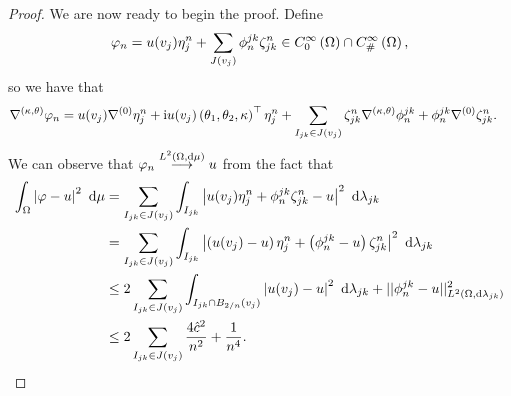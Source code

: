 \begin{proof}
	We are now ready to begin the proof.
	Define 
	\begin{align*}	
		\varphi_n = u(v_j)\eta_j^n + \sum_{J(v_j)}\phi^{jk}_n\zeta_{jk}^n\in C^{\infty}_{0}\left( \Omega \right)\cap C^{\infty}_{\#}\left( \Omega \right),
	\end{align*}
	so we have that
	\begin{align*}
		\nabla^{\left( \kappa, \theta \right)}\varphi_n 
		&= u(v_j)\nabla^{(0)}\eta_j^n + \mathrm{i} u(v_j)\left( \theta_1,\theta_2,\kappa \right)^\top\eta_j^n + \sum_{I_{jk}\in J(v_j)}\zeta_{jk}^n\nabla^{\left( \kappa, \theta \right)}\phi_n^{jk} + \phi_n^{jk}\nabla^{(0)}\zeta_{jk}^n.
	\end{align*}
	We can observe that $\varphi_n\overset{L^{2}\left( \Omega,\mathrm{d} \mu \right)}{\longrightarrow}u$ from the fact that
	\begin{align*}
		\int_{\Omega} \left\lvert \varphi - u \right\rvert^2  \ \mathrm{d}\mu
		&= \sum_{I_{jk}\in J(v_j)}\int_{I_{jk}} \left\lvert u(v_j)\eta_j^n + \phi_n^{jk}\zeta_{jk}^n - u \right\rvert^2  \ \mathrm{d}\lambda_{jk} \\
		&= \sum_{I_{jk}\in J(v_j)}\int_{I_{jk}} \left\lvert \left( u(v_j)-u \right)\eta_j^n + \left( \phi_n^{jk}-u \right)\zeta_{jk}^n \right\rvert^2  \ \mathrm{d}\lambda_{jk} \\
		&\leq 2\sum_{I_{jk}\in J(v_j)} \int_{I_{jk}\cap B_{2/n}(v_j)} \left\lvert u(v_j)-u \right\rvert^2  \ \mathrm{d}\lambda_{jk} + \lvert\lvert \phi_n^{jk}-u \rvert\rvert_{L^{2}\left( \Omega,\mathrm{d} \lambda_{jk} \right)}^2 \\
		&\leq 2\sum_{I_{jk}\in J(v_j)} \frac{4\hat{c}^2}{n^2} + \frac{1}{n^4}.
	\end{align*}
	

\end{proof}
